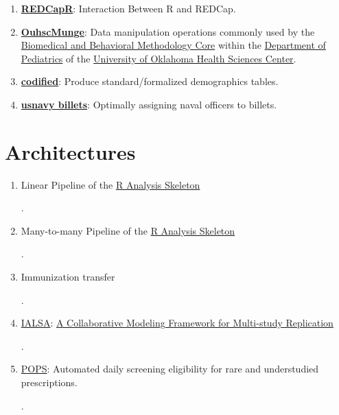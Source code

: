 \documentclass[
]{book}
\providecommand{\tightlist}{%
  \setlength{\itemsep}{0pt}\setlength{\parskip}{0pt}}
\begin{document}
\begin{enumerate}
\def\labelenumi{\arabic{enumi}.}
\tightlist
\item
  \textbf{\href{https://ouhscbbmc.github.io/REDCapR/}{REDCapR}}: Interaction Between R and REDCap.
\item
  \textbf{\href{https://ouhscbbmc.github.io/OuhscMunge/}{OuhscMunge}}: Data manipulation operations commonly used by the \href{http://www.ouhsc.edu/bbmc/}{Biomedical and Behavioral Methodology Core} within the \href{http://www.oumedicine.com/pediatrics}{Department of Pediatrics} of the \href{http://ouhsc.edu/}{University of Oklahoma Health Sciences Center}.
\item
  \textbf{\href{https://ouhscbbmc.github.io/codified/}{codified}}: Produce standard/formalized demographics tables.
\item
  \textbf{\href{https://github.com/OuhscBbmc/usnavy-billets}{usnavy billets}}: Optimally assigning naval officers to billets.
\end{enumerate}

\hypertarget{architectures}{%
\section{Architectures}\label{architectures}}

\begin{enumerate}
\def\labelenumi{\arabic{enumi}.}
\item
  Linear Pipeline of the \href{https://github.com/wibeasley/RAnalysisSkeleton}{R Analysis Skeleton}

  .
\item
  Many-to-many Pipeline of the \href{https://github.com/wibeasley/RAnalysisSkeleton}{R Analysis Skeleton}

  .
\item
  Immunization transfer

  .
\item
  \href{http://www.ialsa.org/}{IALSA}: \href{https://github.com/IALSA/IALSA-2015-Portland/blob/master/pubs/2016-talks/2016-06-09-cpa/ppt/koval-etal-2016-06-10-cpa.pdf}{A Collaborative Modeling Framework for Multi-study Replication}

  .
\item
  \href{https://github.com/OuhscBbmc/darden-pharmaco-1}{POPS}: Automated daily screening eligibility for rare and understudied prescriptions.

  .
\end{enumerate}
\end{document}
